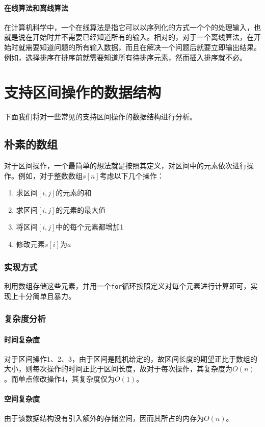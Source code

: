 \documentclass{cjc}
\begin{document}
\paragraph{在线算法和离线算法} 在计算机科学中，一个在线算法是指它可以以序列化的方式一个个的处理输入，也就是说在开始时并不需要已经知道所有的输入。相对的，对于一个离线算法，在开始时就需要知道问题的所有输入数据，而且在解决一个问题后就要立即输出结果。例如，选择排序在排序前就需要知道所有待排序元素，然而插入排序就不必。


\section{支持区间操作的数据结构}

下面我们将对一些常见的支持区间操作的数据结构进行分析。

\subsection{朴素的数组}

对于区间操作，一个最简单的想法就是按照其定义，对区间中的元素依次进行操作。例如，对于整数数组$s[n]$考虑以下几个操作：
\begin{enumerate}
  \item 求区间$[i,j]$的元素的和
  \item 求区间$[i,j]$的元素的最大值
  \item 将区间$[i,j]$中的每个元素都增加1
  \item 修改元素$s[i]$为$a$
\end{enumerate}
\subsubsection{实现方式}
利用数组存储这些元素，并用一个\lstinline{for}循环按照定义对每个元素进行计算即可，实现上十分简单且暴力。

\subsubsection{复杂度分析}
\paragraph{时间复杂度} 对于区间操作1、2、3，由于区间是随机给定的，故区间长度的期望正比于数组的大小，则每次操作的时间正比于区间长度，故对于每次操作，其复杂度为$O(n)$。而单点修改操作4，其复杂度仅为$O(1)$。
\paragraph{空间复杂度} 由于该数据结构没有引入额外的存储空间，因而其所占的内存为$O(n)$。
\end{document}

